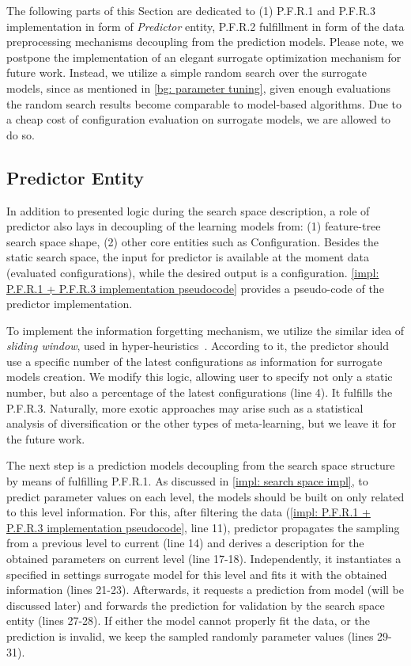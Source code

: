 The following parts of this Section are dedicated to (1) P.F.R.1 and P.F.R.3 implementation in form of \emph{Predictor} entity, P.F.R.2 fulfillment in form of the data preprocessing mechanisms decoupling from the prediction models. Please note, we postpone the implementation of an elegant surrogate optimization mechanism for future work. Instead, we utilize a simple random search over the surrogate models, since as mentioned in \cref{bg: parameter tuning}, given enough evaluations the random search results become comparable to model-based algorithms. Due to a cheap cost of configuration evaluation on surrogate models, we are allowed to do so.

\subsection{Predictor Entity}
In addition to presented logic during the search space description, a role of predictor also lays in decoupling of the learning models from: (1) feature-tree search space shape, (2) other core entities such as Configuration. Besides the static search space, the input for predictor is available at the moment data (evaluated configurations), while the desired output is a configuration. \cref{impl: P.F.R.1 + P.F.R.3 implementation pseudocode} provides a pseudo-code of the predictor implementation.

To implement the information forgetting mechanism, we utilize the similar idea of \emph{sliding window}, used in hyper-heuristics~\cite{ferreira2017multi}. According to it, the predictor should use a specific number of the latest configurations as information for surrogate models creation. We modify this logic, allowing user to specify not only a static number, but also a percentage of the latest configurations (line 4). It fulfills the P.F.R.3. Naturally, more exotic approaches may arise such as a statistical analysis of diversification or the other types of meta-learning, but we leave it for the future work.

The next step is a prediction models decoupling from the search space structure by means of fulfilling P.F.R.1. As discussed in \cref{impl: search space impl}, to predict parameter values on each level, the models should be built on only related to this level information. For this, after filtering the data (\cref{impl: P.F.R.1 + P.F.R.3 implementation pseudocode}, line 11), predictor propagates the sampling from a previous level to current (line 14) and derives a description for the obtained parameters on current level (line 17-18). Independently, it instantiates a specified in settings surrogate model for this level and fits it with the obtained information (lines 21-23). Afterwards, it requests a prediction from model (will be discussed later) and forwards the prediction for validation by the search space entity (lines 27-28). If either the model cannot properly fit the data, or the prediction is invalid, we keep the sampled randomly parameter values (lines 29-31).

